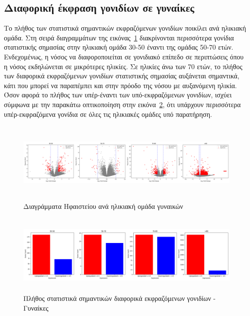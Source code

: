 \documentclass[12pt]{report}
\begin{document}
        \subsection{Διαφορική έκφραση γονιδίων σε γυναίκες}
         \par
            Το πλήθος των στατιστικά σημαντικών εκφραζόμενων γονιδίων ποικίλει ανά ηλικιακή ομάδα. Στη σειρά διαγραμμάτων της εικόνας~\ref{fig:volcano_plot_consoVisits_Female} διακρίνονται περισσότερα γονίδια στατιστικής σημασίας στην ηλικιακή ομάδα 30-50 έναντι της ομάδας 50-70 ετών. Ενδεχομένως, η νόσος να διαφοροποιείται σε γονιδιακό επίπεδο σε περιπτώσεις όπου η νόσος εκδηλώνεται σε μικρότερες ηλικίες. Σε ηλικίες άνω των 70 ετών, το πλήθος των διαφορικά εκφραζόμενων γονιδίων στατιστικής σημασίας αυξάνεται σημαντικά, κάτι που μπορεί να παραπέμπει και στην πρόοδο της νόσου με αυξανόμενη ηλικία. Όσον αφορά το πλήθος των υπέρ-έναντι των υπό-εκφραζόμενων γονιδίων, ισχύει σύμφωνα με την παρακάτω οπτικοποίηση στην εικόνα~\ref{fig:barplot_plot_consoVisits_Female}, ότι υπάρχουν περισσότερα υπέρ-εκφραζόμενα γονίδια σε όλες τις ηλικιακές ομάδες υπό παρατήρηση.
            \begin{figure}[h]
                \centering
                \includegraphics[width=\textwidth,height=4cm]{Chapter-3/volcano_plot_consoVisits_Female.png}
                \caption{Διαγράμματα Ηφαιστείου ανά ηλικιακή ομάδα γυναικών}
                \label{fig:volcano_plot_consoVisits_Female}
            \end{figure}
            \begin{figure}[H]
                \centering
                \includegraphics[width=\textwidth,height=4cm]{Chapter-3/barplot_plot_consoVisits_Female.png}
                \caption{Πλήθος στατιστικά σημαντικών διαφορικά εκφραζόμενων γονιδίων - Γυναίκες}
                \label{fig:barplot_plot_consoVisits_Female}
            \end{figure}
\end{document}
